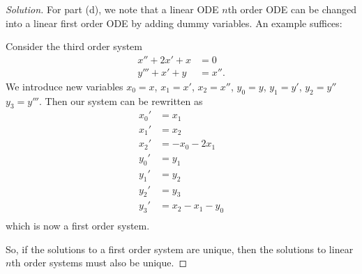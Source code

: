 \documentclass[Shifrin_Solutions_Spring_2018]{subfiles}
\begin{document}
\begin{proof}[Solution]
For part (d), we note that a linear ODE $n$th order ODE can be changed into a linear first order ODE by adding dummy variables. An example suffices:

Consider the third order system
\begin{align*}
x'' + 2x' +x  & = 0 \\
y''' + x' +y & = x'' .
\end{align*}
We introduce new variables $x_0 = x$, $x_1 = x'$, $x_2 = x''$, $y_0 = y$, $y_1=y'$, $y_2 = y''$ $y_3 = y'''$. Then our system can be rewritten as
\begin{align*}
x_0' & = x_1 \\
x_1' & = x_2 \\
x_2' & = -x_0 - 2x_1 \\
y_0' & = y_1 \\
y_1' & = y_2 \\
y_2' & = y_3 \\
y_3' & = x_2 - x_1 - y_0 \\
\end{align*}
which is now a first order system.

So, if the solutions to a first order system are unique, then the solutions to linear $n$th order systems must also be unique.


\end{proof}
\end{document}
